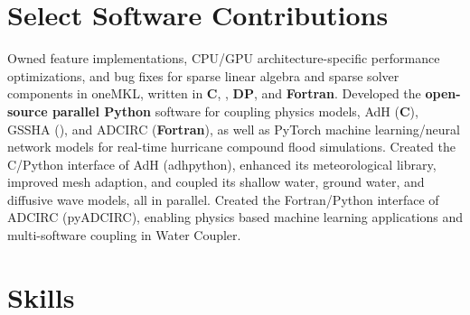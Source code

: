 \documentclass[letterpaper,10pt]{article}
\begin{document}
\section{Select Software Contributions}
  \resumeSubItemListStart
      {Owned feature implementations, CPU/GPU architecture-specific performance
       optimizations, and bug fixes for sparse linear algebra and sparse solver
       components in oneMKL, written in \textbf{C}, \textbf{\CC{}},
       \textbf{DP\CC{}}, and \textbf{Fortran}.}
      {Developed the \textbf{open-source parallel Python} software for coupling
      physics models, AdH (\textbf{C}), GSSHA (\textbf{\CC{}}), and ADCIRC
      (\textbf{Fortran}), as well as PyTorch machine learning/neural network
      models for real-time hurricane compound flood simulations.}
      {Created the C/Python interface of AdH (adhpython), enhanced its meteorological library,
      improved mesh adaption, and coupled its shallow water, ground
      water, and diffusive wave models, all in parallel.}
      {Created the Fortran/Python interface of ADCIRC (pyADCIRC), enabling physics
      based machine learning applications and multi-software coupling in Water
      Coupler.}
  \resumeSubItemListEnd
\vspace{-5pt}

\section{Skills}
  \resumeSubHeadingListStart

      \resumeItemListStart

\end{document}
